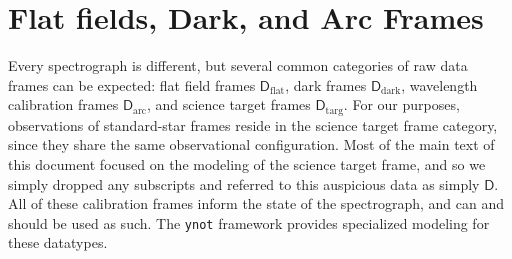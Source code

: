 \documentclass[twocolumn]{aastex631}
\begin{document}
\section{Flat fields, Dark, and Arc Frames} \label{secAppendixDataTypes}

Every spectrograph is different, but several common categories of raw data frames can be expected: flat field frames $\boldsymbol{\mathsf{D}}_{\mathrm{flat}}$, dark frames $\boldsymbol{\mathsf{D}}_{\mathrm{dark}}$, wavelength calibration frames $\boldsymbol{\mathsf{D}}_{\mathrm{arc}}$, and science target frames $\boldsymbol{\mathsf{D}}_{\mathrm{targ}}$.  For our purposes, observations of standard-star frames reside in the science target frame category, since they share the same observational configuration.  Most of the main text of this document focused on the modeling of the science target frame, and so we simply dropped any subscripts and referred to this auspicious data as simply $\boldsymbol{\mathsf{D}}$.  All of these calibration frames inform the state of the spectrograph, and can and should be used as such.  The \texttt{ynot} framework provides specialized modeling for these datatypes.

\clearpage


\end{document}
